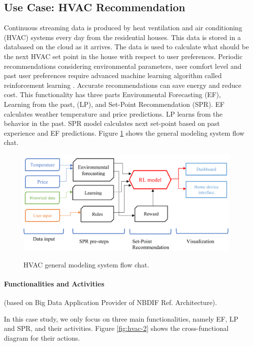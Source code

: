 \subsection{Use Case: HVAC Recommendation}


Continuous streaming data is produced by heat ventilation and air
conditioning (HVAC) systems every day from the residential
houses. This data is stored in a databased on the cloud as it
arrives. The data is used to calculate what should be the next HVAC
set point in the house with respect to user preferences. Periodic
recommendations considering environmental parameters, user comfort
level and past user preferences require advanced machine learning
algorithm called reinforcement learning . Accurate recommendations can save energy and reduce
cost. This functionality has three parts Environmental Forecasting
(EF), Learning from the past, (LP), and Set-Point Recommendation
(SPR). EF calculates weather temperature and price predictions. LP
learns from the behavior in the past. SPR model calculates next
set-point based on past experience and EF
predictions. Figure \ref{fig:hvac-1} shows the general modeling system
flow chat.

\begin{figure}[htb]
\centering\includegraphics[width=1.0\columnwidth]{usecase/hvac.png}
\label{fig:hvac-1}
\caption{HVAC general modeling system flow chat.}
\end{figure}


\paragraph*{Functionalities and Activities} (based on Big Data Application Provider of NBDIF Ref. Architecture).

In this case study, we only focus on three main functionalities, namely EF, LP and SPR, and their
activities. Figure \ref{fig:hvac-2} shows the cross-functional diagram for their actions.



